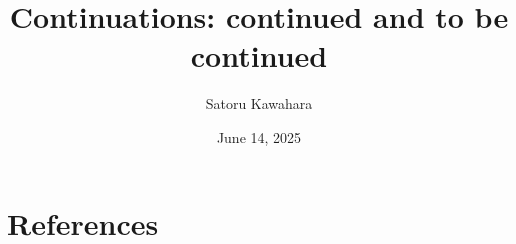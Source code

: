 \documentclass[unicode,compress,14pt,CJK,aspectratio=169,xcolor={dvipsnames}%
  \directlua{
    handout = os.getenv"HANDOUT"
    local _ = handout and tex.print(",handout")
}]{beamer}
\title{Continuations: continued and to be continued}
\author{Satoru Kawahara}
\date{June 14, 2025}
\institute{関数型まつり2025}
\begin{document}
% 
% 
% 
% 
% 

% 
% 

\switchfooter
\section{References}
\begin{frame}[t,allowframebreaks]
	\frametitlesec
	\printbibliography
\end{frame}
\end{document}
